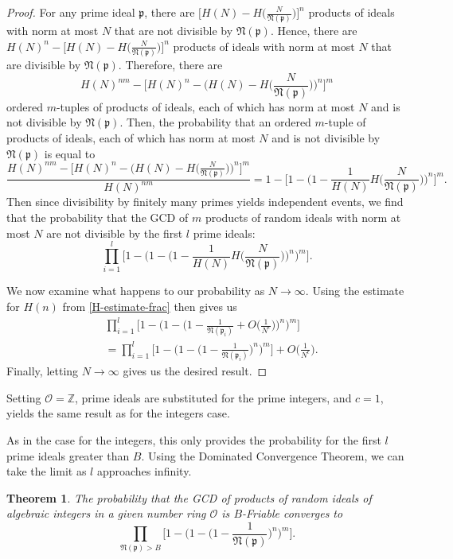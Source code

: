\documentclass[12pt]{amsart}
\newtheorem{theorem}{Theorem}[subsection]
\theoremstyle{definition}
\newcommand{\f}[1]{\mathfrak{#1}}
\begin{document}
\begin{proof}
	For any prime ideal $\mathfrak{p}$, there are $\bigl[H(N)-H\bigl(\frac{N}{\f{N(p)}}\bigr)\bigr]^n$ products of ideals with norm at most $N$ that are not divisible by $\f{N(p)}$. Hence, there are  $H(N)^n-\bigl[H(N)-H\bigl(\frac{N}{\f{N(p)}}\bigr)\bigr]^n$ products of ideals with norm at most \(N\) that are divisible by $\f{N(p)}$. Therefore, there are 
	$$H(N)^{nm}-\Big[H(N)^n - \Big(H(N) - H\Big(\frac{N}{\f{N(p)}}\Big)\Big)^n\Big]^m$$
	ordered $m$-tuples of products of ideals, each of which has norm at most $N$ and is not divisible by $\f{N(p)}$. Then, the probability that an ordered $m$-tuple of products of ideals, each of which has norm at most $N$ and is not divisible by $\f{N(p)}$ is equal to
	$$\frac{H(N)^{nm}-\Big[H(N)^n - \Big(H(N) - H\Big(\frac{N}{\f{N(p)}}\Big)\Big)^n\Big]^m}{H(N)^{nm}} = 1 - \Big[1 - \Big(1 - \frac{1}{H(N)} H\Big(\frac{N}{\f{N(p)}}\Big)\Big)^n\Big]^m.$$
	Then since divisibility by finitely many primes yields independent events, we find that the probability that the GCD of $m$ products of random ideals with norm at most $N$ are not divisible by the first $l$ prime ideals:
	$$\prod_{i=1}^{l} \Big[1 - \Big(1 - \Big(1 - \frac{1}{H(N)} H\Big(\frac{N}{\f{N(p)}}\Big)\Big)^n \Big)^m \Big].$$
	
	We now examine what happens to our probability as $N \to \infty$. Using the estimate for $H(n)$ from \cref{H-estimate-frac} then gives us
	\begin{align*}
		&\prod_{i=1}^{l} \Big[1 - \Big(1 - \Big(1 - \frac{1}{\f{N}(\f{p}_i)} + O\Big(\frac{1}{N^{\epsilon}}\Big) \Big)^n \Big)^m\Big]\\
		&=\prod_{i=1}^{l} \Big[1 - \Big(1 - \Big(1 - \frac{1}{\f{N}(\f{p}_i)}\Big)^n \Big)^m \Big] + O\Big(\frac{1}{N^{\epsilon}}\Big).
	\end{align*}
	Finally, letting $N\to\infty$ gives us the desired result. 
\end{proof}

Setting \(\mathcal{O}=\mathbb{Z}\), prime ideals are substituted for the prime integers, and \(c=1\), yields the same result as for the integers case. 

As in the case for the integers, this only provides the probability for the first \(l\) prime ideals greater than \(B\). Using the Dominated Convergence Theorem, we can take the limit as \(l\) approaches infinity.

\begin{theorem}
	The probability that the GCD of products of random ideals of algebraic integers in a given number ring $\mathcal{O}$ is $B$-Friable converges to
	$$\prod_{\f{N}(\f{p})>B}\Big[1 - \Big(1 - \Big(1 - \frac{1}{\f{N}(\f{p})}\Big)^n \Big)^m \Big].$$
\end{theorem}
\end{document}
